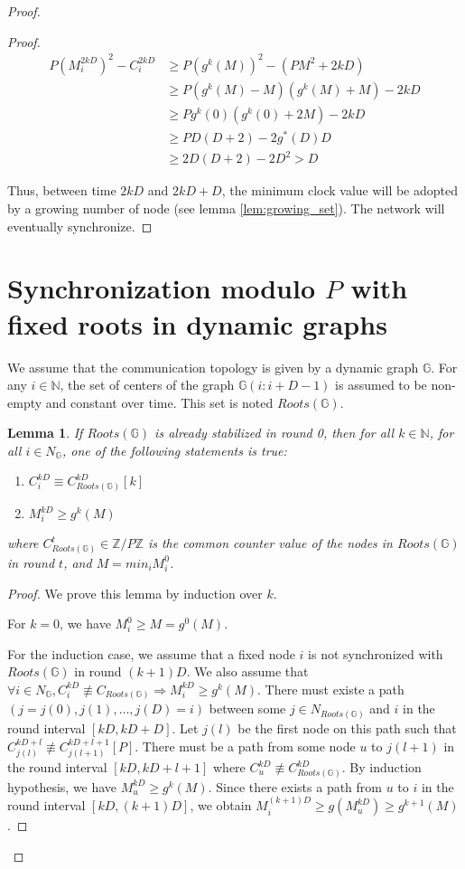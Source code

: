 \documentclass[11pt,letterpaper]{article}
\newtheorem{lem}[thm]{Lemma}
\begin{document}
\begin{proof}
\begin{proof}
	\begin{align*}
		P(M_i^{2kD})^2 - C_i^{2kD} & \geq P(g^k(M))^2-(PM^2+2kD) \\
		& \geq P(g^k(M)-M)(g^k(M)+M)-2kD \\
		& \geq Pg^k(0)(g^k(0)+2M)-2kD \\
		& \geq PD(D+2)-2g^*(D)D \\
		& \geq 2D(D+2)-2D^2 > D
	\end{align*}

	Thus, between time $2kD$ and $2kD + D$,
	the minimum clock value will be adopted by a growing number of node (see lemma \ref{lem:growing_set}).
	The network will eventually synchronize.
\end{proof}

\section{Synchronization modulo $P$ with fixed roots in dynamic graphs}

We assume that the communication topology is given by a dynamic graph $\mathds{G}$.
For any $i \in \mathds{N}$, the set of centers of the graph $\mathds{G}(i:i+D-1)$ is assumed to be non-empty and constant over time.
This set is noted $Roots(\mathds{G})$.

\begin{lem} \label{lem:croissant}
	If $Roots(\mathds{G})$ is already stabilized in round 0, then
	for all $k \in \mathds{N}$, for all $i \in N_\mathds{G}$,
	one of the following statements is true:
	\begin{enumerate}
		\item $C_i^{kD} \equiv C_{Roots(\mathds{G})}^{kD} [k]$
		\item $M_i^{kD} \geq g^{k}(M)$
	\end{enumerate}
	where $C_{Roots(\mathds{G})}^t \in \mathds{Z}/P\mathds{Z}$ is the common counter value of the nodes in $Roots(\mathds{G})$ in round $t$, and $M = min_i M_i^0$.
\end{lem}
\begin{proof}
	We prove this lemma by induction over $k$.

	For $k = 0$, we have $M^0_i \geq M = g^0(M)$.

	For the induction case, we assume that a fixed node $i$ is not synchronized with $Roots(\mathds{G})$ in round $(k+1)D$.
	We also assume that $\forall i \in N_\mathds{G}, C_i^{kD} \not\equiv C_{Roots(\mathds{G})} \Rightarrow M_i^{kD} \geq g^{k}(M)$.
	There must existe a path $(j = j(0), j(1), \dots, j(D) = i)$ between some $j \in N_{Roots(\mathds{G})}$ and $i$ in the round interval $[kD, kD+D]$.
	Let $j(l)$ be the first node on this path such that $C_{j(l)}^{kD+l} \not\equiv C_{j(l+1)}^{kD+l+1} [P]$.
	There must be a path from some node $u$ to $j(l+1)$ in the round interval $[kD, kD+l+1]$ where $C_u^{kD} \not\equiv C^{kD}_{Roots(\mathds{G})}$.
	By induction hypothesis, we have $M_u^{kD} \geq g^{k}(M)$.
	Since there exists a path from $u$ to $i$ in the round interval $[kD, (k+1)D]$,
	we obtain $M_i^{(k+1)D} \geq g(M_u^{kD}) \geq g^{k+1}(M)$.
\end{proof}


\end{proof}
\end{document}
